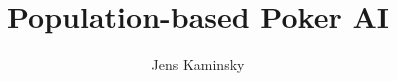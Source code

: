 \documentclass[thesis]{thesis-umich}
\title{Population-based Poker AI}
\author{Jens Kaminsky}
\begin{document}
\listoftodos






\end{document}
